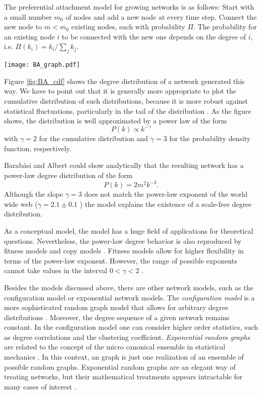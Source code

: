 \documentclass[openright,twoside,headsepline]{scrbook}
\begin{document}
The preferential attachment model for growing networks is as follows:
Start with a small number $m_0$ of nodes and add a new node at every time step.
Connect the new node to $m<m_0$ existing nodes, each with probability $\Pi $.
The probability for an existing node $i$ to be connected with the new one depends on the degree of $i$, i.e. $\Pi (k_i)=k_i/\sum _j k_j$.
\begin{SCfigure}
\texttt{[image: BA\_graph.pdf]}
\caption{Cumulative degree distribution of a \BA graph with $N=10^5$ nodes and $m_0=m=5$.
The dashed line shows a power-law $P(k)\propto k^{-2}$.}
\label{fig:BA_cdf}
\end{SCfigure}

Figure \ref{fig:BA_cdf} shows the degree distribution of a network generated this way.
We have to point out that it is generally more appropriate to plot the cumulative distribution of such distributions, because it is more robust against statistical fluctuations, particularly in the tail of the distribution \citep{Clauset:2009}.
As the figure shows, the distribution is well approximated by a power law of the form
\[
P(k)\propto k^{-\gamma }
\]
with $\gamma =2$ for the cumulative distribution and $\gamma = 3$ for the probability density function, respectively.

Barab\'asi and Albert could show analytically that the resulting network has a power-law degree distribution of the form
\begin{equation}\label{eq:BA_law}
P(k)=2m^2 k^{-3}.
\end{equation}
Although the slope $\gamma = 3$ does not match the power-law exponent of the world wide web ($\gamma = 2.1\pm 0.1$ \citep{Barabasi99}) the model explains the existence of a scale-free degree distribution.

As a conceptual model, the \BA model has a huge field of applications for theoretical questions.
Nevertheless, the power-law degree behavior is also reproduced by fitness models \citep{Bianconi:2001,Fortunato:2006} and copy models \citep{Kleinberg99theweb}.
Fitness models allow for higher flexibility in terms of the power-law exponent.
However, the range of possible exponents cannot take values in the interval $0<\gamma < 2$ \citep{all_scale_free_are_sparse}.

Besides the models discussed above, there are other network models, such as the configuration model or exponential network models. 
The \emph{configuration model} is a more sophisticated random graph model that allows for arbitrary degree distributions \citep{Newman:book,Newman:2001pa}.
Moreover, the degree sequence of a given network remains constant.
In the configuration model one can consider higher order statistics, such as degree correlations and the clustering coefficient.
\emph{Exponential random graphs} are related to the concept of the micro canonical ensemble in statistical mechanics \citep{Strauss:86}.
In this context, an \ER graph is just one realization of an ensemble of possible random graphs.
Exponential random graphs are an elegant way of treating networks, but their mathematical treatments appears intractable for many cases of interest \citep{Newman2003}.
\end{document}
